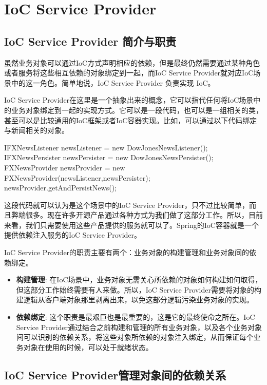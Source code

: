 \section{IoC Service Provider}

\subsection{IoC Service Provider 简介与职责}

虽然业务对象可以通过IoC方式声明相应的依赖，但是最终仍然需要通过某种角色或者服务将这些相互依赖的对象绑定到一起，而IoC Service Provider就对应IoC场景中的这一角色。简单地说，IoC Service Provider 负责实现 IoC。

IoC Service Provider在这里是一个抽象出来的概念，它可以指代任何将IoC场景中的业务对象绑定到一起的实现方式。它可以是一段代码，也可以是一组相关的类，甚至可以是比较通用的IoC框架或者IoC容器实现。比如，可以通过以下代码绑定与新闻相关的对象。

\begin{Java}
IFXNewsListener newsListener = new DowJonesNewsListener(); 
IFXNewsPersister newsPersister = new DowJonesNewsPersister(); 
FXNewsProvider newsProvider = new FXNewsProvider(newsListener,newsPersister); 
newsProvider.getAndPersistNews(); 
\end{Java}

这段代码就可以认为是这个场景中的IoC  Service  Provider，只不过比较简单，而且弊端很多。现在许多开源产品通过各种方式为我们做了这部分工作。所以，目前来看，我们只需要使用这些产品提供的服务就可以了。Spring的IoC容器就是一个提供依赖注入服务的IoC Service Provider。

IoC Service Provider的职责主要有两个：业务对象的构建管理和业务对象间的依赖绑定。

\begin{itemize}
    \item \textbf{构建管理}: 在IoC场景中，业务对象无需关心所依赖的对象如何构建如何取得，但这部分工作始终需要有人来做。所以，IoC Service Provider需要将对象的构建逻辑从客户端对象那里剥离出来，以免这部分逻辑污染业务对象的实现。
    \item \textbf{依赖绑定}: 这个职责是最艰巨也是最重要的，这是它的最终使命之所在。IoC Service Provider通过结合之前构建和管理的所有业务对象，以及各个业务对象间可以识别的依赖关系，将这些对象所依赖的对象注入绑定，从而保证每个业务对象在使用的时候，可以处于就绪状态。
\end{itemize}

\subsection{IoC Service Provider管理对象间的依赖关系}

